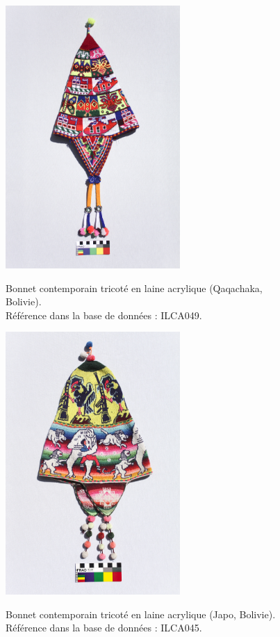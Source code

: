 \begin{figure}[!h]
    \begin{minipage}[c]{.5\linewidth}
            \begin{center}
                \includegraphics[height=10cm]{../images/ILCA049.jpg}
                 \caption{Bonnet contemporain tricoté en laine acrylique (Qaqachaka, Bolivie).\\ Référence dans la base de données : ILCA049.}
            \end{center}
    \label{fig:ILCA049}
    \end{minipage}
    \hspace{5pt}
    \begin{minipage}[c]{.5\linewidth}
        \begin{center}
        		\includegraphics[height=10cm]{../images/ILCA045.jpg}
		 \caption{Bonnet contemporain tricoté en laine acrylique (Japo, Bolivie).\\ Référence dans la base de données : ILCA045.}
	\end{center}
    \label{fig:ILCA045}   
    \end{minipage}
\end{figure}

